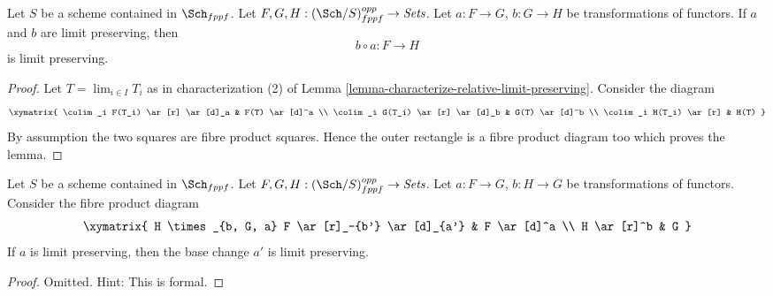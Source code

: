 \begin{lemma}
\label{lemma-composition-locally-finite-presentation}
Let $S$ be a scheme contained in $\Sch_{fppf}$.
Let $F, G, H : (\Sch/S)_{fppf}^{opp} \to \textit{Sets}$.
Let $a : F \to G$, $b : G \to H$ be transformations of functors.
If $a$ and $b$ are limit preserving, then
$$
b \circ a : F \longrightarrow H
$$
is limit preserving.
\end{lemma}

\begin{proof}
Let $T = \lim_{i \in I} T_i$ as in characterization (2) of
Lemma \ref{lemma-characterize-relative-limit-preserving}.
Consider the diagram
$$
\xymatrix{
\colim_i F(T_i) \ar[r] \ar[d]_a & F(T) \ar[d]^a \\
\colim_i G(T_i) \ar[r] \ar[d]_b & G(T) \ar[d]^b \\
\colim_i H(T_i) \ar[r] & H(T)
}
$$
By assumption the two squares are fibre product squares. Hence the
outer rectangle is a fibre product diagram too which proves the lemma.
\end{proof}

\begin{lemma}
\label{lemma-base-change-locally-finite-presentation}
Let $S$ be a scheme contained in $\Sch_{fppf}$.
Let $F, G, H : (\Sch/S)_{fppf}^{opp} \to \textit{Sets}$.
Let $a : F \to G$, $b : H \to G$ be transformations of functors.
Consider the fibre product diagram
$$
\xymatrix{
H \times_{b, G, a} F \ar[r]_-{b'} \ar[d]_{a'} & F \ar[d]^a \\
H \ar[r]^b & G
}
$$
If $a$ is limit preserving, then the base change $a'$ is limit preserving.
\end{lemma}

\begin{proof}
Omitted. Hint: This is formal.
\end{proof}


